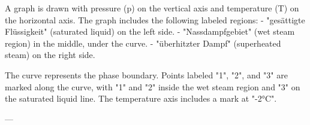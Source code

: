 A graph is drawn with pressure (p) on the vertical axis and temperature (T) on the horizontal axis. The graph includes the following labeled regions:  
- "gesättigte Flüssigkeit" (saturated liquid) on the left side.  
- "Nassdampfgebiet" (wet steam region) in the middle, under the curve.  
- "überhitzter Dampf" (superheated steam) on the right side.  

The curve represents the phase boundary. Points labeled "1", "2", and "3" are marked along the curve, with "1" and "2" inside the wet steam region and "3" on the saturated liquid line. The temperature axis includes a mark at "-2°C".  

---